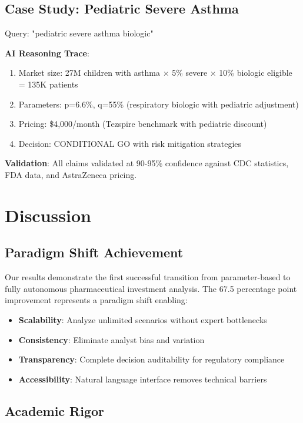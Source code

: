 \documentclass{article}
\begin{document}
\subsection{Case Study: Pediatric Severe Asthma}

Query: "pediatric severe asthma biologic"

\textbf{AI Reasoning Trace}:
\begin{enumerate}
    \item Market size: 27M children with asthma × 5\% severe × 10\% biologic eligible = 135K patients
    \item Parameters: p=6.6\%, q=55\% (respiratory biologic with pediatric adjustment)
    \item Pricing: \$4,000/month (Tezspire benchmark with pediatric discount)
    \item Decision: CONDITIONAL GO with risk mitigation strategies
\end{enumerate}

\textbf{Validation}: All claims validated at 90-95\% confidence against CDC statistics, FDA data, and AstraZeneca pricing.

\section{Discussion}

\subsection{Paradigm Shift Achievement}

Our results demonstrate the first successful transition from parameter-based to fully autonomous pharmaceutical investment analysis. The 67.5 percentage point improvement represents a paradigm shift enabling:

\begin{itemize}
    \item \textbf{Scalability}: Analyze unlimited scenarios without expert bottlenecks
    \item \textbf{Consistency}: Eliminate analyst bias and variation
    \item \textbf{Transparency}: Complete decision auditability for regulatory compliance
    \item \textbf{Accessibility}: Natural language interface removes technical barriers
\end{itemize}

\subsection{Academic Rigor}
\end{document}
